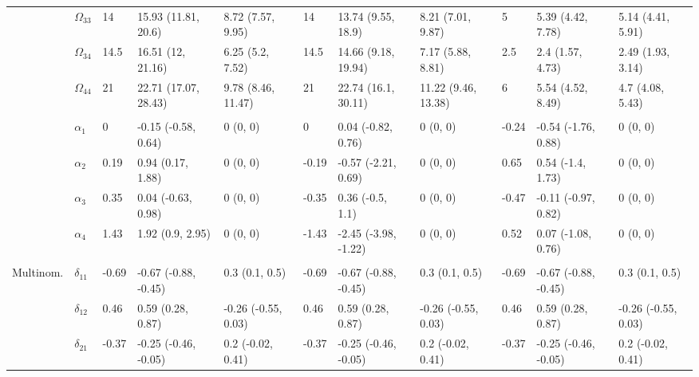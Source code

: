 \documentclass[]{article}
\begin{document}
\begin{landscape}
\begin{table}[t]
\begin{tabular}{lllllllllll}
\hspace{1em} & $\Omega_{33}$ & 14 & 15.93 (11.81, 20.6) & 8.72 (7.57, 9.95) & 14 & 13.74 (9.55, 18.9) & 8.21 (7.01, 9.87) & 5 & 5.39 (4.42, 7.78) & 5.14 (4.41, 5.91)\\
\hspace{1em} & $\Omega_{34}$ & 14.5 & 16.51 (12, 21.16) & 6.25 (5.2, 7.52) & 14.5 & 14.66 (9.18, 19.94) & 7.17 (5.88, 8.81) & 2.5 & 2.4 (1.57, 4.73) & 2.49 (1.93, 3.14)\\
\hspace{1em} & $\Omega_{44}$ & 21 & 22.71 (17.07, 28.43) & 9.78 (8.46, 11.47) & 21 & 22.74 (16.1, 30.11) & 11.22 (9.46, 13.38) & 6 & 5.54 (4.52, 8.49) & 4.7 (4.08, 5.43)\\
\addlinespace[0.3em]
\multicolumn{11}{l}{\textbf{ }}\\
\hspace{1em} & $\alpha_{1}$ & 0 & -0.15 (-0.58, 0.64) & 0 (0, 0) & 0 & 0.04 (-0.82, 0.76) & 0 (0, 0) & -0.24 & -0.54 (-1.76, 0.88) & 0 (0, 0)\\
\hspace{1em} & $\alpha_{2}$ & 0.19 & 0.94 (0.17, 1.88) & 0 (0, 0) & -0.19 & -0.57 (-2.21, 0.69) & 0 (0, 0) & 0.65 & 0.54 (-1.4, 1.73) & 0 (0, 0)\\
\hspace{1em} & $\alpha_{3}$ & 0.35 & 0.04 (-0.63, 0.98) & 0 (0, 0) & -0.35 & 0.36 (-0.5, 1.1) & 0 (0, 0) & -0.47 & -0.11 (-0.97, 0.82) & 0 (0, 0)\\
\hspace{1em} & $\alpha_{4}$ & 1.43 & 1.92 (0.9, 2.95) & 0 (0, 0) & -1.43 & -2.45 (-3.98, -1.22) & 0 (0, 0) & 0.52 & 0.07 (-1.08, 0.76) & 0 (0, 0)\\
\addlinespace[0.3em]
\multicolumn{11}{l}{\textbf{ }}\\
\hspace{1em}Multinom. & $\delta_{11}$ & -0.69 & -0.67 (-0.88, -0.45) & 0.3 (0.1, 0.5) & -0.69 & -0.67 (-0.88, -0.45) & 0.3 (0.1, 0.5) & -0.69 & -0.67 (-0.88, -0.45) & 0.3 (0.1, 0.5)\\
\hspace{1em} & $\delta_{12}$ & 0.46 & 0.59 (0.28, 0.87) & -0.26 (-0.55, 0.03) & 0.46 & 0.59 (0.28, 0.87) & -0.26 (-0.55, 0.03) & 0.46 & 0.59 (0.28, 0.87) & -0.26 (-0.55, 0.03)\\
\hspace{1em} & $\delta_{21}$ & -0.37 & -0.25 (-0.46, -0.05) & 0.2 (-0.02, 0.41) & -0.37 & -0.25 (-0.46, -0.05) & 0.2 (-0.02, 0.41) & -0.37 & -0.25 (-0.46, -0.05) & 0.2 (-0.02, 0.41)\\

\end{tabular}
\end{table}
\end{landscape}
\end{document}
